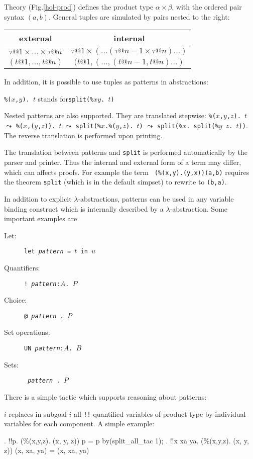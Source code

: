 Theory  (Fig.\ts\ref{hol-prod}) defines the product type
$\alpha\times\beta$, with the ordered pair syntax $(a, b)$.  General
tuples are simulated by pairs nested to the right:
\begin{center}
\begin{tabular}{c|c}
external & internal \\
\hline
$\tau@1 \times \dots \times \tau@n$ & $\tau@1 \times (\dots (\tau@{n-1} \times \tau@n)\dots)$ \\
\hline
$(t@1,\dots,t@n)$ & $(t@1,(\dots,(t@{n-1},t@n)\dots)$ \\
\end{tabular}
\end{center}
In addition, it is possible to use tuples
as patterns in abstractions:
\begin{center}
{\tt\%($x$,$y$). $t$} \quad stands for\quad \texttt{split(\%$x$\thinspace$y$. $t$)} 
\end{center}
Nested patterns are also supported.  They are translated stepwise:
{\tt\%($x$,$y$,$z$). $t$} $\leadsto$ {\tt\%($x$,($y$,$z$)). $t$} $\leadsto$
{\tt split(\%$x$.\%($y$,$z$). $t$)} $\leadsto$ \texttt{split(\%$x$. split(\%$y$
  $z$. $t$))}.  The reverse translation is performed upon printing.
\begin{warn}
  The translation between patterns and \texttt{split} is performed automatically
  by the parser and printer.  Thus the internal and external form of a term
  may differ, which can affects proofs.  For example the term {\tt
  (\%(x,y).(y,x))(a,b)} requires the theorem \texttt{split} (which is in the
  default simpset) to rewrite to {\tt(b,a)}.
\end{warn}
In addition to explicit $\lambda$-abstractions, patterns can be used in any
variable binding construct which is internally described by a
$\lambda$-abstraction.  Some important examples are
\begin{description}
\item[Let:] \texttt{let {\it pattern} = $t$ in $u$}
\item[Quantifiers:] \texttt{!~{\it pattern}:$A$.~$P$}
\item[Choice:] {\underscoreon \tt @~{\it pattern}~.~$P$}
\item[Set operations:] \texttt{UN~{\it pattern}:$A$.~$B$}
\item[Sets:] \texttt{{\ttlbrace}~{\it pattern}~.~$P$~{\ttrbrace}}
\end{description}

There is a simple tactic which supports reasoning about patterns:
\begin{ttdescription}
\item[\ttindexbold{split_all_tac} $i$] replaces in subgoal $i$ all
  {\tt!!}-quantified variables of product type by individual variables for
  each component.  A simple example:
\begin{ttbox}
{. !!p. (\%(x,y,z). (x, y, z)) p = p}
by(split_all_tac 1);
{. !!x xa ya. (\%(x,y,z). (x, y, z)) (x, xa, ya) = (x, xa, ya)}
\end{ttbox}
\end{ttdescription}

